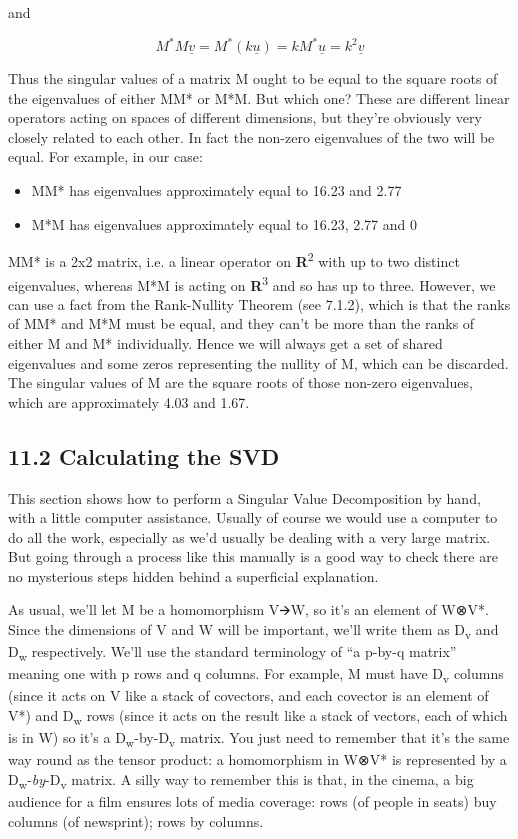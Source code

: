 \documentclass[oneside,english]{amsbook}
\numberwithin{section}{chapter}
\theoremstyle{plain}
\theoremstyle{definition}
\begin{document}
and

\[{M^{*}M\underline{v} = M^{*}\left( k\underline{u} \right)
}{= kM^{*}\underline{u}
}{= k^{2}\underline{v}}\]

Thus the singular values of a matrix M ought to be equal to the square
roots of the eigenvalues of either MM* or M*M. But which one? These are
different linear operators acting on spaces of different dimensions, but
they're obviously very closely related to each other. In fact the
non-zero eigenvalues of the two will be equal. For example, in our case:

\begin{itemize}
	\item
	MM* has eigenvalues approximately equal to 16.23 and 2.77
	\item
	M*M has eigenvalues approximately equal to 16.23, 2.77 and 0
\end{itemize}

MM* is a 2x2 matrix, i.e. a linear operator on
\textbf{R}\textsuperscript{2} with up to two distinct eigenvalues,
whereas M*M is acting on \textbf{R}\textsuperscript{3} and so has up to
three. However, we can use a fact from the Rank-Nullity Theorem (see
7.1.2), which is that the ranks of MM* and M*M must be equal, and they
can't be more than the ranks of either M and M* individually. Hence we
will always get a set of shared eigenvalues and some zeros representing
the nullity of M, which can be discarded. The singular values of M are
the square roots of those non-zero eigenvalues, which are approximately
4.03 and 1.67.

\subsection{11.2 Calculating the SVD}\label{calculating-the-svd}

This section shows how to perform a Singular Value Decomposition by
hand, with a little computer assistance. Usually of course we would use
a computer to do all the work, especially as we'd usually be dealing
with a very large matrix. But going through a process like this manually
is a good way to check there are no mysterious steps hidden behind a
superficial explanation.

As usual, we'll let M be a homomorphism V🡪W, so it's an element of W⊗V*.
Since the dimensions of V and W will be important, we'll write them as
D\textsubscript{v} and D\textsubscript{w} respectively. We'll use the
standard terminology of ``a p-by-q matrix'' meaning one with p rows and
q columns. For example, M must have D\textsubscript{v} columns (since it
acts on V like a stack of covectors, and each covector is an element of
V*) and D\textsubscript{w} rows (since it acts on the result like a
stack of vectors, each of which is in W) so it's a
D\textsubscript{w}-by-D\textsubscript{v} matrix. You just need to
remember that it's the same way round as the tensor product: a
homomorphism in W⊗V* is represented by a
D\textsubscript{w}-\emph{by}-D\textsubscript{v} matrix. A silly way to
remember this is that, in the cinema, a big audience for a film ensures
lots of media coverage: rows (of people in seats) buy columns (of
newsprint); rows by columns.
\end{document}
